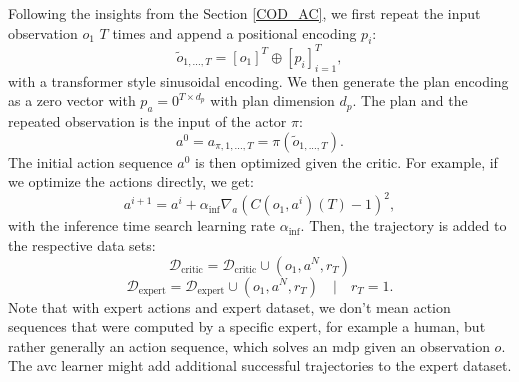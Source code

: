 Following the insights from the Section \ref{COD_AC}, we first repeat the input observation $o_1$ $T$ times and append a positional encoding $p_i$:
\begin{equation}
    \label{eq:seq_emb}
    \tilde{o}_{1, ..., T} = [o_1]^T \oplus [p_i]_{i=1}^T,
\end{equation}
with a transformer style sinusoidal encoding.
We then generate the plan encoding as a zero vector with $p_a = 0^{T \times d_p}$ with plan dimension $d_p$. The plan and the repeated observation is the input 
of the actor $\pi$:
\begin{equation}
    a^0 = a_{\pi, 1,...,T} = \pi(\tilde{o}_{1, ..., T}).
\end{equation}
The initial action sequence $a^0$ is then optimized given the critic. For example, if we optimize the actions directly, we get:
\begin{equation*}
    a^{i+1} = a^i + \alpha_{\mathrm{inf}}\nabla_{a} (C(o_1, a^i)(T) - 1)^2,
\end{equation*}
with the inference time search learning rate $\alpha_{\mathrm{inf}}$. Then, the trajectory is added to the respective data sets:
\begin{equation}
    \mathcal{D}_{\text{critic}} = \mathcal{D}_{\text{critic}} \cup (o_1, a^N, r_T)
\end{equation}
\begin{equation*}
    \mathcal{D}_{\text{expert}} = \mathcal{D}_{\text{expert}} \cup (o_1, a^N, r_T)\quad |\quad r_T = 1.
\end{equation*}
Note that with expert actions and expert dataset, we don't mean action sequences that were computed by 
a specific expert, for example a human, but rather generally an action sequence, which solves an \ac{mdp} given an observation $o$. The \ac{avc} learner might add 
additional successful trajectories to the expert dataset. \\


